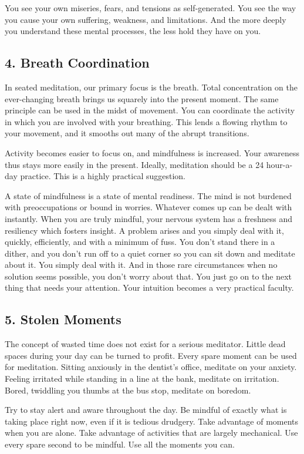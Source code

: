 You see your own miseries, fears, and tensions as self-generated. You see the
way you cause your own suffering, weakness, and limitations. And the more deeply
you understand these mental processes, the less hold they have on you.

\subsection*{4. Breath Coordination} In seated meditation, our primary focus is the breath.
Total concentration on the ever-changing breath brings us squarely into the
present moment. The same principle can be used in the midst of movement. You can
coordinate the activity in which you are involved with your breathing. This
lends a flowing rhythm to your movement, and it smooths out many of the abrupt
transitions.

Activity becomes easier to focus on, and mindfulness is increased. Your
awareness thus stays more easily in the present. Ideally, meditation should be a
24 hour-a-day practice. This is a highly practical suggestion.

A state of mindfulness is a state of mental readiness. The mind is not burdened
with preoccupations or bound in worries.
Whatever comes up can be dealt with instantly. When you are truly mindful, your nervous system has a freshness and resiliency
which fosters insight. A problem arises and you simply deal with it, quickly, efficiently, and with a minimum of fuss. You don't
stand there in a dither, and you don't run off to a quiet corner so you can sit
down and meditate about it. You simply deal with it.
And in those rare circumstances when no solution seems possible, you don't worry about that. You just go on to the next thing
that needs your attention. Your intuition becomes a very practical faculty.

\subsection*{5. Stolen Moments} The concept of wasted time does not exist for a serious
meditator. Little dead spaces during your day can be turned to profit. Every
spare moment can be used for meditation. Sitting anxiously in the dentist's
office, meditate on your anxiety. Feeling irritated while standing in a line at
the bank, meditate on irritation. Bored, twiddling you thumbs at the bus stop,
meditate on boredom.

Try to stay alert and aware throughout the day. Be mindful of exactly what is
taking place right now, even if it is tedious drudgery. Take advantage of
moments when you are alone. Take advantage of activities that are largely
mechanical. Use every spare second to be mindful. Use all the moments you can.

